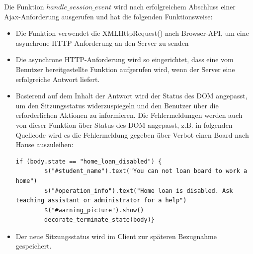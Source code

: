 Die Funktion $handle\_session\_event$ wird nach erfolgreichem Abschluss einer Ajax-Anforderung ausgerufen und hat die folgenden Funktionsweise:
\begin{itemize}
	\item Die Funktion verwendet die XMLHttpRequest() nach Browser-API, um eine asynchrone HTTP-Anforderung an den Server zu senden
	\item Die asynchrone HTTP-Anforderung wird so eingerichtet, dass eine vom Benutzer bereitgestellte Funktion aufgerufen wird, wenn der Server eine erfolgreiche Antwort liefert.
	\item Basierend auf dem Inhalt der Antwort wird der Status des DOM angepasst, um den Sitzungsstatus widerzuspiegeln und den Benutzer über die erforderlichen Aktionen zu informieren. Die Fehlermeldungen werden auch von dieser Funktion über Status des DOM angepasst, z.B. in folgenden Quellcode wird es die Fehlermeldung gegeben über Verbot einen Board nach Hause auszuleihen:
	\begin{lstlisting}[caption={Änderung des DOM im Fall des Verbot der Home-Ausleihe},captionpos=b]
	if (body.state == "home_loan_disabled") {
		$("#student_name").text("You can not loan board to work a home")
		$("#operation_info").text("Home loan is disabled. Ask teaching assistant or administrator for a help")
		$("#warning_picture").show()
		decorate_terminate_state(body)}
	\end{lstlisting}
	\item Der neue Sitzungsstatus wird im Client zur späteren Bezugnahme gespeichert.
\end{itemize}

